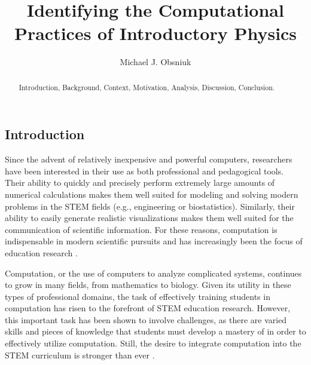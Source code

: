 \documentclass{msuphddissertation}
\author{Michael J. Obsniuk}
\title{Identifying the Computational Practices of Introductory Physics}
\begin{document}
\maketitlepage

\begin{abstract}
Introduction, Background, Context, Motivation, Analysis, Discussion, Conclusion.
\end{abstract}

\TOC
\LOT
\LOF

\newpage
{}
\begin{doublespace}



\chapter{Introduction}\label{CH1:Introduction}

Since the advent of relatively inexpensive and powerful computers, researchers have been interested in their use as both professional and pedagogical tools.  Their ability to quickly and precisely perform extremely large amounts of numerical calculations makes them well suited for modeling and solving modern problems in the STEM fields (e.g., engineering or biostatistics).  Similarly, their ability to easily generate realistic visualizations makes them well suited for the communication of scientific information.  For these reasons, computation is indispensable in modern scientific pursuits and has increasingly been the focus of education research \cite{Ivie2002,Bundy2007}.

Computation, or the use of computers to analyze complicated systems, continues to grow in many fields, from mathematics to biology.  Given its utility in these types of professional domains, the task of effectively training students in computation has risen to the forefront of STEM education research.  However, this important task has been shown to involve challenges, as there are varied skills and pieces of knowledge that students must develop a mastery of in order to effectively utilize computation.  Still, the desire to integrate computation into the STEM curriculum is stronger than ever \cite{Chonacky2008}.


\end{doublespace}
\end{document}
